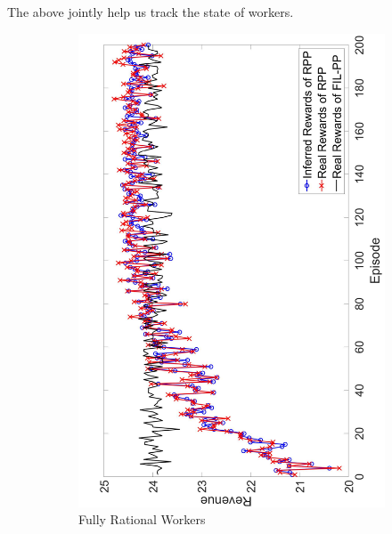 \documentclass[letterpaper]{article} %
\begin{document}
The above jointly help us track the state of workers.
\begin{figure}[htb]
    \centering
    \hspace{-4mm}
    \begin{subfigure}[t]{0.35\textwidth}
        \centering
        \includegraphics[width=\textwidth]{image/1}
        \caption{\label{E1} Fully Rational Workers}
    \end{subfigure}%
    ~\hspace{-6mm}
    \begin{subfigure}[t]{0.35\textwidth}
        \centering

\end{subfigure}
\end{figure}
\end{document}
